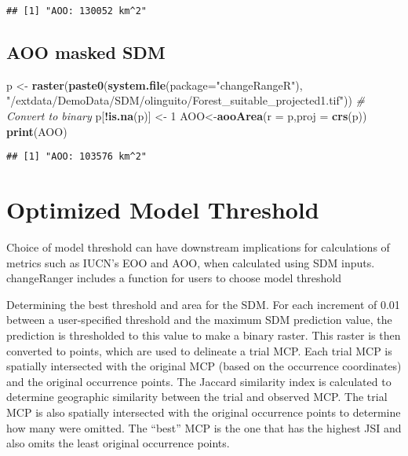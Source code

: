 \documentclass[
]{article}
\newenvironment{Shaded}{\begin{snugshade}}{\end{snugshade}}
\newcommand{\CommentTok}[1]{\textcolor[rgb]{0.56,0.35,0.01}{\textit{#1}}}
\newcommand{\DataTypeTok}[1]{\textcolor[rgb]{0.13,0.29,0.53}{#1}}
\newcommand{\DecValTok}[1]{\textcolor[rgb]{0.00,0.00,0.81}{#1}}
\newcommand{\KeywordTok}[1]{\textcolor[rgb]{0.13,0.29,0.53}{\textbf{#1}}}
\newcommand{\NormalTok}[1]{#1}
\newcommand{\OperatorTok}[1]{\textcolor[rgb]{0.81,0.36,0.00}{\textbf{#1}}}
\newcommand{\StringTok}[1]{\textcolor[rgb]{0.31,0.60,0.02}{#1}}
\begin{document}
\begin{verbatim}
## [1] "AOO: 130052 km^2"
\end{verbatim}

\hypertarget{aoo-masked-sdm}{%
\subsection{AOO masked SDM}\label{aoo-masked-sdm}}

\begin{Shaded}
\begin{Highlighting}[]
\NormalTok{p <-}\StringTok{ }\KeywordTok{raster}\NormalTok{(}\KeywordTok{paste0}\NormalTok{(}\KeywordTok{system.file}\NormalTok{(}\DataTypeTok{package=}\StringTok{"changeRangeR"}\NormalTok{), }\StringTok{"/extdata/DemoData/SDM/olinguito/Forest_suitable_projected1.tif"}\NormalTok{))}
\CommentTok{# Convert to binary}
\NormalTok{p[}\OperatorTok{!}\KeywordTok{is.na}\NormalTok{(p)] <-}\StringTok{ }\DecValTok{1}
\NormalTok{AOO<-}\KeywordTok{aooArea}\NormalTok{(}\DataTypeTok{r =}\NormalTok{ p,}\DataTypeTok{proj =} \KeywordTok{crs}\NormalTok{(p))}
\KeywordTok{print}\NormalTok{(AOO)}
\end{Highlighting}
\end{Shaded}

\begin{verbatim}
## [1] "AOO: 103576 km^2"
\end{verbatim}

\hypertarget{optimized-model-threshold}{%
\section{Optimized Model Threshold}\label{optimized-model-threshold}}

Choice of model threshold can have downstream implications for
calculations of metrics such as IUCN's EOO and AOO, when calculated
using SDM inputs. changeRanger includes a function for users to choose
model threshold

Determining the best threshold and area for the SDM. For each increment
of 0.01 between a user-specified threshold and the maximum SDM
prediction value, the prediction is thresholded to this value to make a
binary raster. This raster is then converted to points, which are used
to delineate a trial MCP. Each trial MCP is spatially intersected with
the original MCP (based on the occurrence coordinates) and the original
occurrence points. The Jaccard similarity index is calculated to
determine geographic similarity between the trial and observed MCP. The
trial MCP is also spatially intersected with the original occurrence
points to determine how many were omitted. The ``best'' MCP is the one
that has the highest JSI and also omits the least original occurrence
points.
\end{document}
